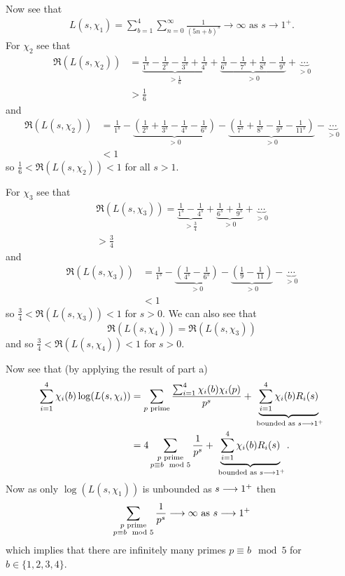 \documentclass{unswmaths}
\begin{document}
Now see that 
\begin{align*}
	L(s,\chi_1) = \sum_{b = 1}^4 \sum_{n=0}^\infty \frac{1}{(5n+b)^s} \longrightarrow \infty \text{ as } s \longrightarrow 1^+.
\end{align*}
For $ \chi_2 $ see that 
\begin{align*}
	\Re(L(s, \chi_2)) &= \underbrace{\frac{1}{1^s} - \frac{1}{2^s} -\frac{1}{3^s} + \frac{1}{4^s}}_{>\frac{1}{6}} + \underbrace{\frac{1}{6^s} - \frac{1}{7^s} + \frac{1}{8^s} - \frac{1}{9^s}}_{> 0 } + \underbrace{\cdots}_{>0} \\
		&> \frac{1}{6}
\end{align*}
and 
\begin{align*}
	\Re(L(s, \chi_2)) &= \frac{1}{1^s} - \underbrace{\left( \frac{1}{2^s} +\frac{1}{3^s} - \frac{1}{4^s} - \frac{1}{6^s} \right)}_{>0} - 
		\underbrace{\left(\frac{1}{7^s} + \frac{1}{8^s} - \frac{1}{9^s} - \frac{1}{11^s} \right)}_{>0} - \underbrace{\cdots}_{>0} \\
		&< 1
\end{align*}
so $ \frac{1}{6} < \Re(L(s, \chi_2)) < 1 $ for all $ s > 1 $.

For $ \chi_3 $ see that
\begin{align*}
	\Re(L(s, \chi_3)) = \underbrace{\frac{1}{1^s} - \frac{1}{4^s}}_{>\frac{3}{4}} + 
		\underbrace{\frac{1}{6^s} + \frac{1}{9^s}}_{>0} + \underbrace{\cdots}_{>0} \\
		> \frac{3}{4}
\end{align*}
and 
\begin{align*}
	\Re(L(s, \chi_3)) &= \frac{1}{1^s} - \underbrace{\left( \frac{1}{4^s} - \frac{1}{6^s} \right)}_{>0} - \underbrace{\left( \frac{1}{9} - \frac{1}{11} \right)}_{>0} - \underbrace{\cdots}_{>0} \\
		&< 1
\end{align*}
so $ \frac{3}{4} < \Re(L(s, \chi_3)) < 1 $ for $ s > 0 $. 
We can also see that $$ \Re(L(s, \chi_4)) = \Re(L(s, \chi_3)) $$ and so $ \frac{3}{4} < \Re(L(s, \chi_4)) < 1 $ for $ s > 0 $.

Now see that (by applying the result of part a)
\begin{align*}
	\sum_{i=1}^4 \chi_i(b) \log( L(s, \chi_i)) &= \sum_{p \text{ prime}} \frac{\sum_{i=1}^{4}\chi_i(b)\chi_i(p)}{p^s} + \underbrace{\sum_{i=1}^4 \chi_i(b)R_i(s)}_{\text{ bounded as } s \longrightarrow 1^+}\\
		&= 4\sum_{\substack{p \text{ prime} \\ p \equiv b\mod 5 }} \frac{1}{p^s} + \underbrace{\sum_{i=1}^4 \chi_i(b)R_i(s)}_{\text{ bounded as } s \longrightarrow 1^+}.
\end{align*}
Now as only $ \log(L(s, \chi_1)) $ is unbounded as $ s \longrightarrow 1^+ $ then 
$$
\sum_{\substack{p \text{ prime} \\ p \equiv b\mod 5 }} \frac{1}{p^s} \longrightarrow \infty \text{ as } s \longrightarrow 1^+
$$
which implies that there are infinitely many primes $ p \equiv b \mod 5 $ for $ b \in \{ 1,2,3,4 \} $.
\end{document}
